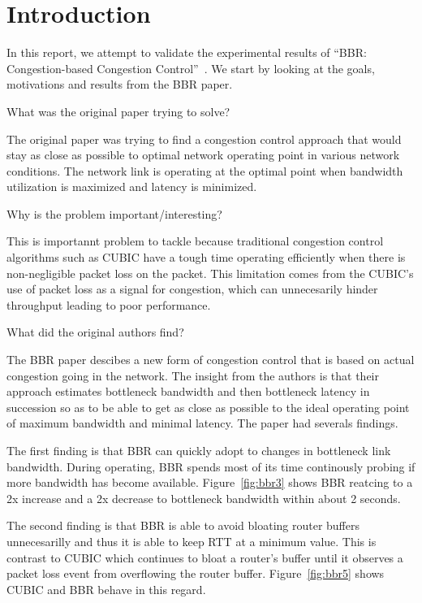 
\section{Introduction}
In this report, we attempt to validate the experimental results of ``BBR:
Congestion-based Congestion Control''~\cite{cardwell2016bbr}. We start
by looking at the goals, motivations and results from the BBR
\cite{cardwell2016bbr} paper.

What was the original paper trying to solve?

The original paper was trying to find a congestion control approach
that would stay as close as possible to optimal network operating point
in various network conditions. The network link is operating at the optimal
point when bandwidth utilization is maximized and latency is minimized.

Why is the problem important/interesting?

This is importannt problem to tackle because traditional congestion control
algorithms such as CUBIC have a tough time operating efficiently when there
is non-negligible packet loss on the packet. This limitation comes from the
CUBIC's use of packet loss as a signal for congestion, which can unnecesarily
hinder throughput leading to poor performance.


What did the original authors find?

The BBR paper descibes a new form of congestion control that is based on actual
congestion going in the network. The insight from the authors is that their
approach estimates bottleneck bandwidth and then bottleneck latency in succession
so as to be able to get as close as possible to the ideal operating point of
maximum bandwidth and minimal latency. The paper had severals findings.


The first finding is that BBR can quickly adopt to changes in bottleneck link bandwidth.
During operating, BBR spends most of its time continously probing if more bandwidth has
become available. Figure~\ref{fig:bbr3} shows BBR reatcing to a 2x increase and a 2x decrease
to bottleneck bandwidth within about 2 seconds.

The second finding is that BBR is able to avoid bloating router buffers unnecesarilly and thus
it is able to keep RTT at a minimum value. This is contrast to CUBIC which continues to bloat
a router's buffer until it observes a packet loss event from overflowing the router buffer.
Figure~\ref{fig:bbr5} shows CUBIC and BBR behave in this regard.

